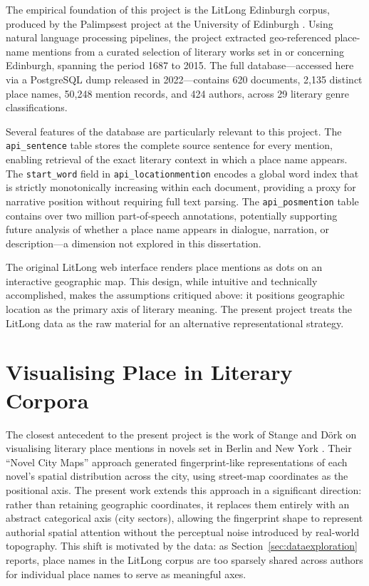\documentclass[logo,msc]{infthesis}
\begin{document}
The empirical foundation of this project is the LitLong Edinburgh corpus, produced by the Palimpsest project at the University of Edinburgh \cite{anderson2016}. Using natural language processing pipelines, the project extracted geo-referenced place-name mentions from a curated selection of literary works set in or concerning Edinburgh, spanning the period 1687 to 2015. The full database---accessed here via a PostgreSQL dump released in 2022---contains 620 documents, 2,135 distinct place names, 50,248 mention records, and 424 authors, across 29 literary genre classifications.
 
Several features of the database are particularly relevant to this project. The \texttt{api\_sentence} table stores the complete source sentence for every mention, enabling retrieval of the exact literary context in which a place name appears. The \texttt{start\_word} field in \texttt{api\_locationmention} encodes a global word index that is strictly monotonically increasing within each document, providing a proxy for narrative position without requiring full text parsing. The \texttt{api\_posmention} table contains over two million part-of-speech annotations, potentially supporting future analysis of whether a place name appears in dialogue, narration, or description---a dimension not explored in this dissertation.
 
The original LitLong web interface renders place mentions as dots on an interactive geographic map. This design, while intuitive and technically accomplished, makes the assumptions critiqued above: it positions geographic location as the primary axis of literary meaning. The present project treats the LitLong data as the raw material for an alternative representational strategy.
 
\section{Visualising Place in Literary Corpora}
 
The closest antecedent to the present project is the work of Stange and D{\"o}rk on visualising literary place mentions in novels set in Berlin and New York \cite{stange2015}. Their ``Novel City Maps'' approach generated fingerprint-like representations of each novel's spatial distribution across the city, using street-map coordinates as the positional axis. The present work extends this approach in a significant direction: rather than retaining geographic coordinates, it replaces them entirely with an abstract categorical axis (city sectors), allowing the fingerprint shape to represent authorial spatial attention without the perceptual noise introduced by real-world topography. This shift is motivated by the data: as Section~\ref{sec:dataexploration} reports, place names in the LitLong corpus are too sparsely shared across authors for individual place names to serve as meaningful axes.
 
\end{document}

